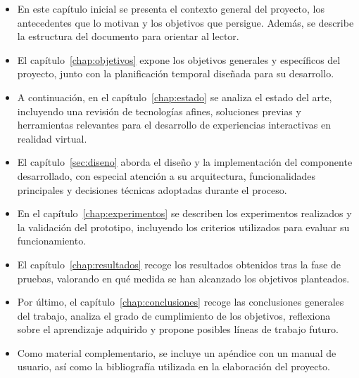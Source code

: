 \documentclass[a4paper, 12pt]{book}
\begin{document}
\begin{itemize}
  \item En este capítulo inicial se presenta el contexto general del proyecto, los antecedentes que lo motivan y los objetivos que persigue. Además, se describe la estructura del documento para orientar al lector.

  \item El capítulo~\ref{chap:objetivos} expone los objetivos generales y específicos del proyecto, junto con la planificación temporal diseñada para su desarrollo.

  \item A continuación, en el capítulo~\ref{chap:estado} se analiza el estado del arte, incluyendo una revisión de tecnologías afines, soluciones previas y herramientas relevantes para el desarrollo de experiencias interactivas en realidad virtual.

  \item El capítulo~\ref{sec:diseno} aborda el diseño y la implementación del componente desarrollado, con especial atención a su arquitectura, funcionalidades principales y decisiones técnicas adoptadas durante el proceso.

  \item En el capítulo~\ref{chap:experimentos} se describen los experimentos realizados y la validación del prototipo, incluyendo los criterios utilizados para evaluar su funcionamiento.

  \item El capítulo~\ref{chap:resultados} recoge los resultados obtenidos tras la fase de pruebas, valorando en qué medida se han alcanzado los objetivos planteados.

  \item Por último, el capítulo~\ref{chap:conclusiones} recoge las conclusiones generales del trabajo, analiza el grado de cumplimiento de los objetivos, reflexiona sobre el aprendizaje adquirido y propone posibles líneas de trabajo futuro.

  \item Como material complementario, se incluye un apéndice con un manual de usuario, así como la bibliografía utilizada en la elaboración del proyecto.
\end{itemize}


\end{document}
